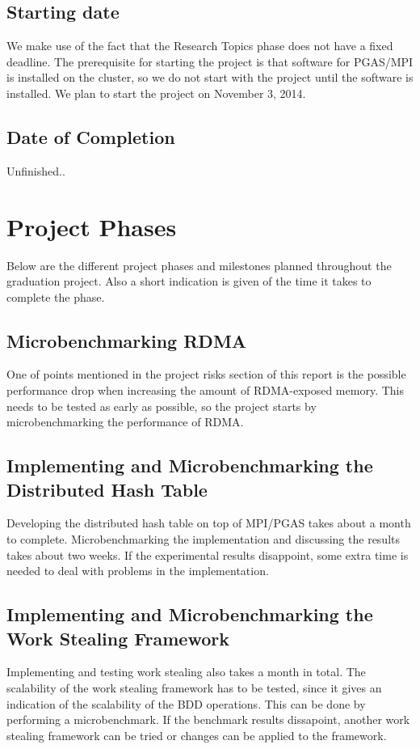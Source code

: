 \subsection{Starting date}
We make use of the fact that the Research Topics phase does not have a fixed deadline. The prerequisite for starting the project is that software for PGAS/MPI is installed on the cluster, so we do not start with the project until the software is installed. We plan to start the project on November 3, 2014.

\subsection{Date of Completion}
Unfinished..

\section{Project Phases}
Below are the different project phases and milestones planned throughout the graduation project. Also a short indication is given of the time it takes to complete the phase.

\subsection{Microbenchmarking RDMA}
One of points mentioned in the project risks section of this report is the possible performance drop when increasing the amount of RDMA-exposed memory. This needs to be tested as early as possible, so the project starts by microbenchmarking the performance of RDMA.  

\subsection{Implementing and Microbenchmarking the Distributed Hash Table}
Developing the distributed hash table on top of MPI/PGAS takes about a month to complete. Microbenchmarking the implementation and discussing the results takes about two weeks. If the experimental results disappoint, some extra time is needed to deal with problems in the implementation.

\subsection{Implementing and Microbenchmarking the Work Stealing Framework}
Implementing and testing work stealing also takes a month in total. The scalability of the work stealing framework has to be tested, since it gives an indication of the scalability of the BDD operations. This can be done by performing a microbenchmark. If the benchmark results dissapoint, another work stealing framework can be tried or changes can be applied to the framework.

